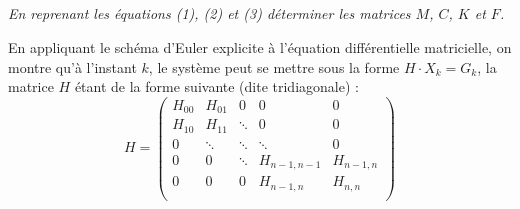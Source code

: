 \documentclass[10pt]{article}
\newif\ifprof
\begin{document}
\subparagraph{}
\textit{En reprenant les équations (1), (2) et (3) déterminer les matrices $M$, $C$, $K$ et $F$.}
\ifprof
\begin{corrige}
\footnotesize{
$$
M =
\begin{pmatrix}
m  &  0 & 0 \\
0  & \ddots &0 \\
0 & 0 &  m \\
 \end{pmatrix}
 \quad
C =
\begin{pmatrix}
2c  & -c &  0 & \cdots & \cdots & \cdots  & 0 \\
-c  & 2c & -c & \ddots &  & 0& \vdots\\
0 & -c  & 2c & \ddots & \ddots &  & \vdots\\
\vdots & \ddots &\ddots & \ddots & \ddots & \ddots & \vdots\\
\vdots &  & \ddots &\ddots& 2c & -c & 0 \\
\vdots & 0 &  & \ddots & -c & 2c & -c\\
0 & \cdots & \cdots & \cdots & 0 & -c & 2c\\
 \end{pmatrix}
 \quad
K =
\begin{pmatrix}
2k  & -k &  0 & \cdots & \cdots & \cdots  & 0 \\
-k & 2k & -k & \ddots &  & 0& \vdots\\
0 & -k  & 2k & \ddots & \ddots &  & \vdots\\
\vdots & \ddots &\ddots & \ddots & \ddots & \ddots & \vdots\\
\vdots &  & \ddots &\ddots& 2k & -k & 0 \\
\vdots & 0 &  & \ddots & -k & 2k & -k\\
0 & \cdots & \cdots & \cdots & 0 & -k & 2k\\
 \end{pmatrix}
 \quad
 F =
 \begin{pmatrix}
 0 \\
 \vdots \\
 0 \\
 f_n(t) 
 \end{pmatrix}
$$}
\end{corrige}
\else
\fi


En appliquant le schéma d'Euler explicite à l'équation différentielle matricielle, on montre qu'à l'instant $k$, le système peut se mettre sous la forme $H\cdot X_k = G_k$, la matrice $H$ étant de la forme suivante (dite tridiagonale) :
$$
H =
\begin{pmatrix}
H_{00}  & H_{01} &  0 & 0 & 0 \\
H_{10}  & H_{11} &  \ddots & 0 & 0 \\
0 & \ddots & \ddots & \ddots & 0 \\
0 & 0 & \ddots & H_{n-1,n-1} & H_{n-1,n} \\
0 & 0 & 0 & H_{n-1,n} & H_{n,n} \\
\end{pmatrix}
 $$
\end{document}
